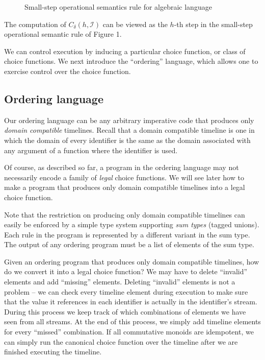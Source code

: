 \begin{figure*}
\label{fig:opsem}
\begin{prooftree}
\end{prooftree}
\caption{Small-step operational semantics rule for algebraic language}
\end{figure*}

The computation of $C_\delta(h, \mathcal{I})$ can be viewed as the $h$-th step in the small-step operational semantic rule of Figure 1.

We can control execution by inducing a particular choice function, or class of choice functions.  We next introduce the ``ordering'' language, which allows one to exercise control over the choice function.


\subsection{Ordering language}

Our ordering language can be any arbitrary imperative code that produces only {\em domain compatible} timelines.  Recall that a domain compatible timeline is one in which the domain of every identifier is the same as the domain associated with any argument of a function where the identifier is used.

Of course, as described so far, a program in the ordering language may not necessarily encode a family of {\em legal} choice functions.  We will see later how to make a program that produces only domain compatible timelines into a legal choice function.

Note that the restriction on producing only domain compatible timelines can easily be enforced by a simple type system supporting {\em sum types} (tagged unions).  Each rule in the program is represented by a different variant in the sum type.  The output of any ordering program must be a list of elements of the sum type.

Given an ordering program that produces only domain compatible timelines, how do we convert it into a legal choice function?  We may have to delete ``invalid'' elements and add ``missing'' elements.  Deleting ``invalid'' elements is not a problem -- we can check every timeline element during execution to make sure that the value it references in each identifier is actually in the identifier's stream.  During this process we keep track of which combinations of elements we have seen from all streams.  At the end of this process, we simply add timeline elements for every ``missed'' combination.  If all commutative monoids are idempotent, we can simply run the canonical choice function over the timeline after we are finished executing the timeline.

